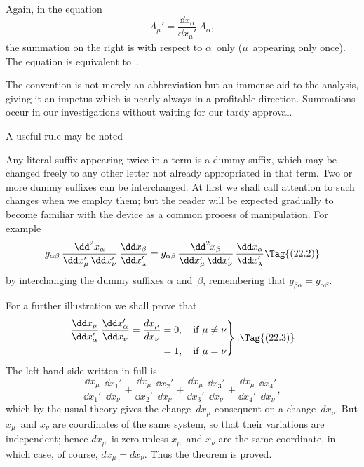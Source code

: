 \documentclass[12pt]{book}
\begin{document}
Again, in the equation
\[
A_{\mu}' = \frac{\dd x_{\alpha}}{\dd x_{\mu}'}\, A_{\alpha},
\]
the summation on the right is with respect to $\alpha$~only ($\mu$~appearing only once).
The equation is equivalent to~.

The convention is not merely an abbreviation but an immense aid to the
analysis, giving it an impetus which is nearly always in a profitable direction.
Summations occur in our investigations without waiting for our tardy approval.

A useful rule may be noted---

Any literal suffix appearing twice in a term is a dummy suffix, which may
be changed freely to any other letter not already appropriated in that term.
Two or more dummy suffixes can be interchanged\footnotemark.\footnotetext
  {At first we shall call attention to such changes when we employ them; but the reader will
  be expected gradually to become familiar with the device as a common process of manipulation.}
For example
%
\[
g_{\alpha\beta}\, \frac{\dd^{2} x_{\alpha}}{\dd x_{\mu}'\, \dd x_{\nu}'}\, \frac{\dd x_{\beta}}{\dd x_{\lambda}'}
= g_{\alpha\beta}\, \frac{\dd^{2} x_{\beta}}{\dd x_{\mu}'\, \dd x_{\nu}'}\, \frac{\dd x_{\alpha}}{\dd x_{\lambda}'}
\Tag{(22.2)}
\]
{\Loosen by interchanging the dummy suffixes $\alpha$ and~$\beta$, remembering that $g_{\beta\alpha} = g_{\alpha\beta}$.}

For a further illustration we shall prove that
\[
\left.
\begin{aligned}
  \frac{\dd x_{\mu}}{\dd x_{\alpha}'}\, \frac{\dd x_{\alpha}'}{\dd x_{\nu}}
  = \frac{dx_{\mu}}{dx_{\nu}}
  &= 0,\quad \text{if $\mu \neq \nu$} \\
  &= 1,\quad \text{if $\mu = \nu$}
\end{aligned}
\right\}.
\Tag{(22.3)}
\]
The left-hand side written in full is
\[
\frac{\dd x_{\mu}}{\dd x_{1}'}\, \frac{\dd x_{1}'}{\dd x_{\nu}}
+ \frac{\dd x_{\mu}}{\dd x_{2}'}\, \frac{\dd x_{2}'}{\dd x_{\nu}}
+ \frac{\dd x_{\mu}}{\dd x_{3}'}\, \frac{\dd x_{3}'}{\dd x_{\nu}}
+ \frac{\dd x_{\mu}}{\dd x_{4}'}\, \frac{\dd x_{4}'}{\dd x_{\nu}},
\]
which by the usual theory gives the change~$dx_{\mu}$ consequent on a change~$dx_{\nu}$.
But $x_{\mu}$~and $x_{\nu}$ are coordinates of the same system, so that their variations are
independent; hence $dx_{\mu}$~is zero unless $x_{\mu}$~and $x_{\nu}$ are the same coordinate, in
which case, of course, $dx_{\mu} = dx_{\nu}$. Thus the theorem is proved.
\end{document}
